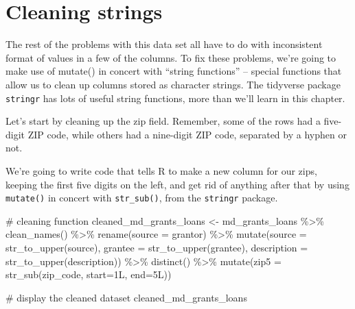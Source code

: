 \documentclass[
  letterpaper,
  DIV=11,
  numbers=noendperiod]{scrreprt}
\newenvironment{Shaded}{\begin{snugshade}}{\end{snugshade}}
\newcommand{\AttributeTok}[1]{\textcolor[rgb]{0.40,0.45,0.13}{#1}}
\newcommand{\CommentTok}[1]{\textcolor[rgb]{0.37,0.37,0.37}{#1}}
\newcommand{\FunctionTok}[1]{\textcolor[rgb]{0.28,0.35,0.67}{#1}}
\newcommand{\NormalTok}[1]{\textcolor[rgb]{0.00,0.23,0.31}{#1}}
\newcommand{\OtherTok}[1]{\textcolor[rgb]{0.00,0.23,0.31}{#1}}
\newcommand{\SpecialCharTok}[1]{\textcolor[rgb]{0.37,0.37,0.37}{#1}}
\begin{document}
\hypertarget{cleaning-strings}{%
\section{Cleaning strings}\label{cleaning-strings}}

The rest of the problems with this data set all have to do with
inconsistent format of values in a few of the columns. To fix these
problems, we're going to make use of mutate() in concert with ``string
functions'' -- special functions that allow us to clean up columns
stored as character strings. The tidyverse package \texttt{stringr} has
lots of useful string functions, more than we'll learn in this chapter.

Let's start by cleaning up the zip field. Remember, some of the rows had
a five-digit ZIP code, while others had a nine-digit ZIP code, separated
by a hyphen or not.

We're going to write code that tells R to make a new column for our
zips, keeping the first five digits on the left, and get rid of anything
after that by using \texttt{mutate()} in concert with
\texttt{str\_sub()}, from the \texttt{stringr} package.

\begin{Shaded}
\begin{Highlighting}[]
\CommentTok{\# cleaning function}
\NormalTok{cleaned\_md\_grants\_loans }\OtherTok{\textless{}{-}}\NormalTok{ md\_grants\_loans }\SpecialCharTok{\%\textgreater{}\%}
  \FunctionTok{clean\_names}\NormalTok{() }\SpecialCharTok{\%\textgreater{}\%} 
  \FunctionTok{rename}\NormalTok{(}\AttributeTok{source =}\NormalTok{ grantor) }\SpecialCharTok{\%\textgreater{}\%} 
  \FunctionTok{mutate}\NormalTok{(}\AttributeTok{source =} \FunctionTok{str\_to\_upper}\NormalTok{(source), }\AttributeTok{grantee =} \FunctionTok{str\_to\_upper}\NormalTok{(grantee), }\AttributeTok{description =} \FunctionTok{str\_to\_upper}\NormalTok{(description)) }\SpecialCharTok{\%\textgreater{}\%} 
  \FunctionTok{distinct}\NormalTok{() }\SpecialCharTok{\%\textgreater{}\%}
  \FunctionTok{mutate}\NormalTok{(}\AttributeTok{zip5 =} \FunctionTok{str\_sub}\NormalTok{(zip\_code, }\AttributeTok{start=}\NormalTok{1L, }\AttributeTok{end=}\NormalTok{5L))}


\CommentTok{\# display the cleaned dataset}
\NormalTok{cleaned\_md\_grants\_loans}
\end{Highlighting}
\end{Shaded}
\end{document}
